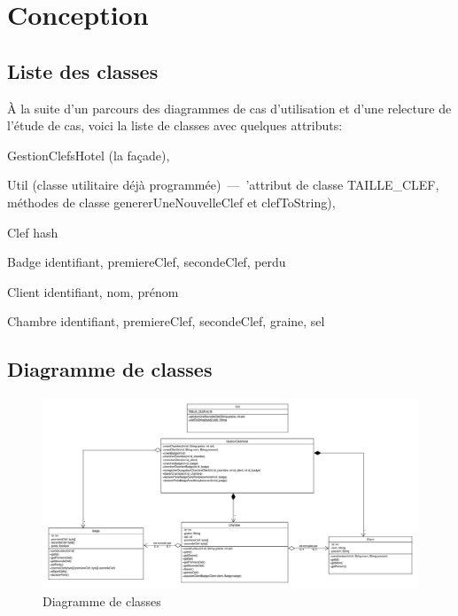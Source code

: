 \documentclass[11pt,article]{article}
\begin{document}
\section{Conception}

\subsection{Liste des classes}

À la suite d'un parcours des diagrammes de cas d'utilisation et d'une
relecture de l'étude de cas, voici la liste de classes avec quelques
attributs:
\begin{compactitem}
\item \textsf{GestionClefsHotel} (la façade),
\item \textsf{Util} (classe utilitaire déjà programmée)~---~'attribut
  de classe \textsf{TAILLE\_CLEF}, méthodes de classe
  \textsf{genererUneNouvelleClef} et \textsf{clefToString}),
\item \textsf{Clef} hash
\item \textsf{Badge} identifiant, premiereClef, secondeClef, perdu
\item \textsf{Client} identifiant, nom, prénom
\item \textsf{Chambre} identifiant, premiereClef, secondeClef, graine, sel
\end{compactitem}
\newpage

\subsection{Diagramme de classes}

\begin{figure}[h!]
\begin{center}
\includegraphics[scale=0.4]{DiagrammesDeClasses/gestionclefshotel_uml_diag_classes}
\caption{Diagramme de classes}
\end{center}
\label{umlet_diag_classes}
\end{figure}
\end{document}
